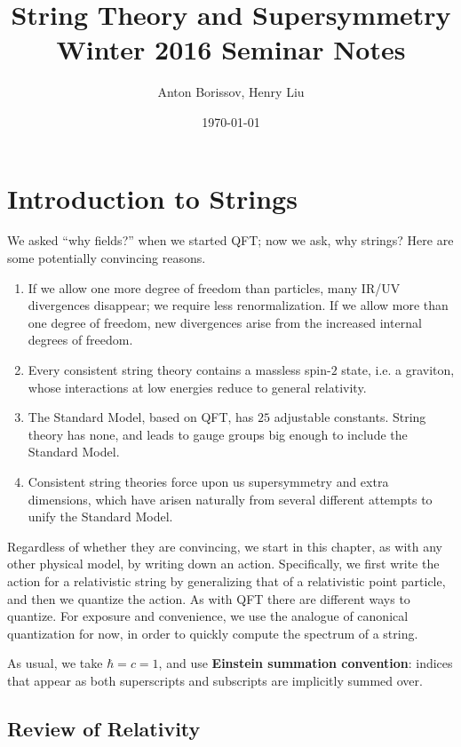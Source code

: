 \documentclass{report}
\title{String Theory and Supersymmetry\\Winter 2016 Seminar Notes}
\author{Anton Borissov, Henry Liu}
\date{\today}
\theoremstyle{plain}
\theoremstyle{definition}
\theoremstyle{remark}
\begin{document}
\maketitle

\tableofcontents

\chapter{Introduction to Strings}

We asked ``why fields?'' when we started QFT; now we ask, why strings?
Here are some potentially convincing reasons.
\begin{enumerate}
\item If we allow one more degree of freedom than particles, many
  IR/UV divergences disappear; we require less renormalization. If we
  allow more than one degree of freedom, new divergences arise from
  the increased internal degrees of freedom.
\item Every consistent string theory contains a massless spin-$2$
  state, i.e. a graviton, whose interactions at low energies reduce to
  general relativity.
\item The Standard Model, based on QFT, has $25$ adjustable constants.
  String theory has none, and leads to gauge groups big enough to
  include the Standard Model.
\item Consistent string theories force upon us supersymmetry and
  extra dimensions, which have arisen naturally from several different
  attempts to unify the Standard Model.
\end{enumerate}

Regardless of whether they are convincing, we start in this chapter,
as with any other physical model, by writing down an action.
Specifically, we first write the action for a relativistic string by
generalizing that of a relativistic point particle, and then we
quantize the action. As with QFT there are different ways to quantize.
For exposure and convenience, we use the analogue of canonical
quantization for now, in order to quickly compute the spectrum of a
string.

As usual, we take $\hbar = c = 1$, and use {\bf Einstein summation
  convention}: indices that appear as both superscripts and subscripts
are implicitly summed over.

\section{Review of Relativity}
\end{document}
